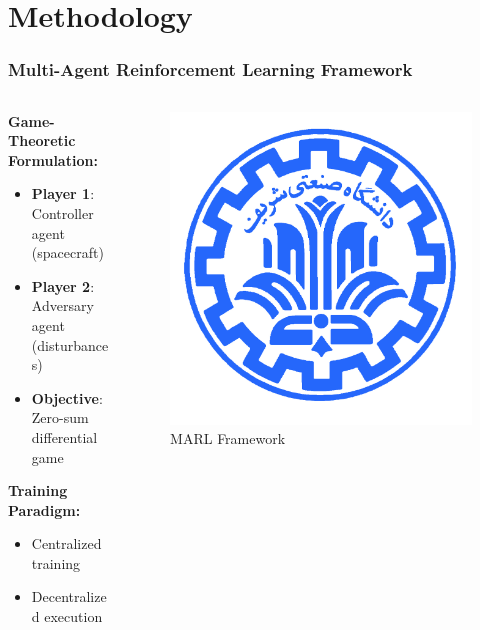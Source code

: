 \documentclass[
    11pt, %
    aspectratio=169, %
]{beamer}
\begin{document}
\section{Methodology}

\begin{frame}
	\frametitle{Multi-Agent Reinforcement Learning Framework}
	
	\begin{columns}[t]
		\begin{column}{0.6\textwidth}
			\textbf{Game-Theoretic Formulation:}
			\begin{itemize}
				\item \textbf{Player 1}: Controller agent (spacecraft)
				\item \textbf{Player 2}: Adversary agent (disturbances)
				\item \textbf{Objective}: Zero-sum differential game
			\end{itemize}
			
			\vspace{0.3cm}
			\textbf{Training Paradigm:}
			\begin{itemize}
				\item Centralized training
				\item Decentralized execution
			\end{itemize}
		\end{column}
		\begin{column}{0.4\textwidth}
			\begin{figure}
				\centering
				\includegraphics[width=\textwidth]{framework_diagram.png}
				\caption{MARL Framework}
			\end{figure}
		\end{column}
	\end{columns}
	

\end{frame}
\end{document}

